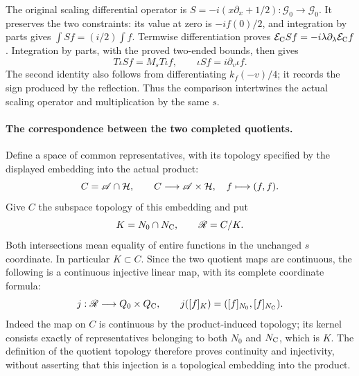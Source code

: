 The original scaling differential operator is
$S=-i(x\partial_x+1/2):\mathcal G_0\to\mathcal G_0$.
It preserves the two constraints: its value at zero is $-if(0)/2$,
and integration by parts gives $\int Sf=(i/2)\int f$.
Termwise differentiation proves
$\mathcal E_{\rm C}Sf=-i\lambda\partial_\lambda\mathcal E_{\rm C}f$.
Integration by parts, with the proved two-ended bounds, then gives
\begin{equation}
 T\iota Sf=M_s T\iota f,\qquad
 \iota Sf=i\partial_v\iota f.
 \label{ccb:scaling-intertwiner}
\end{equation}
The second identity also follows from differentiating $k_f(-v)/4$;
it records the sign produced by the reflection. Thus the comparison
intertwines the actual scaling operator and multiplication by the same $s$.

\paragraph{The correspondence between the two completed quotients.}
Define a space of common representatives, with its topology specified by
the displayed embedding into the actual product:
\begin{equation}
 C=\mathscr A\cap\mathcal H,\qquad
 C\longrightarrow\mathscr A\times\mathcal H,\quad f\longmapsto(f,f).
 \label{ccb:common-space}
\end{equation}
Give $C$ the subspace topology of this embedding and put
\begin{equation}
 K=N_0\cap N_{\rm C},\qquad \mathscr R=C/K.
 \label{ccb:relation-space}
\end{equation}
Both intersections mean equality of entire functions in the unchanged
$s$ coordinate. In particular $K\subset C$. Since the two quotient
maps are continuous, the following is a continuous injective linear map,
with its complete coordinate formula:
\begin{equation}
 j:\mathscr R\longrightarrow Q_0\times Q_{\rm C},\qquad
 j([f]_K)=([f]_{N_0},[f]_{N_{\rm C}}).
 \label{ccb:quotient-correspondence}
\end{equation}
Indeed the map on $C$ is continuous by the product-induced topology;
its kernel consists exactly of representatives belonging to both
$N_0$ and $N_{\rm C}$, which is $K$. The definition of the quotient
topology therefore proves continuity and injectivity, without asserting
that this injection is a topological embedding into the product.

